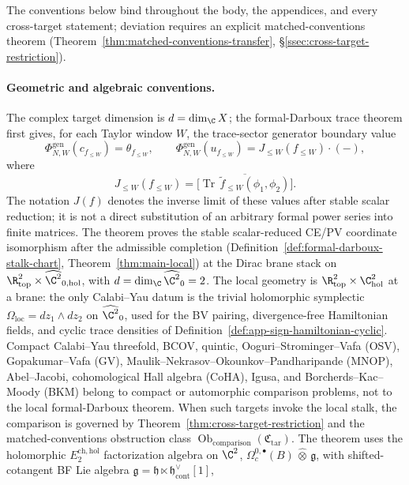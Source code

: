 \documentclass[11pt]{memoir}
\begin{document}
The conventions below bind throughout the body, the appendices,
and every cross-target statement; deviation requires an explicit
matched-conventions theorem
(Theorem~\ref{thm:matched-conventions-transfer},
\S\ref{ssec:cross-target-restriction}).

\paragraph{Geometric and algebraic conventions.}
The complex target dimension is \(d=\dim_\C X\); the formal-Darboux
trace theorem first gives, for each Taylor window \(W\), the
trace-sector generator boundary value
\[
  \Phi_{N,W}^{\mathrm{gen}}(c_{f_{\leq W}})
    =\theta_{f_{\leq W}},\qquad
  \Phi_{N,W}^{\mathrm{gen}}(u_{f_{\leq W}})
    =J_{\leq W}(f_{\leq W})\cdot(-),
\]
where
\[
  J_{\leq W}(f_{\leq W})
  =
  \bigl[\overline{\operatorname{Tr}\,
  \tilde f_{\leq W}(\phi_1,\phi_2)}\bigr].
\]
The notation \(J(f)\) denotes the inverse limit of these values after
stable scalar reduction; it is not a direct substitution of an arbitrary
formal power series into finite matrices.  The theorem proves the stable
scalar-reduced CE/PV coordinate isomorphism after the
admissible completion (Definition~\ref{def:formal-darboux-stalk-chart},
Theorem~\ref{thm:main-local}) at the Dirac brane stack on
\(\R^2_{\mathrm{top}}\times\widehat{\C^2}_{0,\mathrm{hol}}\), with
\(d=\dim_\C\widehat{\C^2}_0=2\).  The local geometry is
\(\R^2_{\mathrm{top}}\times\C^2_{\mathrm{hol}}\) at a brane:
the only Calabi--Yau datum is the trivial holomorphic symplectic
\(\Omega_{\mathrm{loc}}=dz_1\wedge dz_2\) on \(\widehat{\C^2}_0\), used
for the BV pairing, divergence-free Hamiltonian fields, and cyclic
trace densities of Definition~\ref{def:app-sign-hamiltonian-cyclic}.
Compact Calabi--Yau threefold, BCOV, quintic,
Ooguri--Strominger--Vafa (OSV),
Gopakumar--Vafa (GV), Maulik--Nekrasov--Okounkov--Pandharipande (MNOP),
Abel--Jacobi, cohomological Hall algebra (CoHA), Igusa, and
Borcherds--Kac--Moody (BKM) belong to compact or automorphic
comparison problems, not to the local formal-Darboux theorem.  When such
targets invoke the local stalk, the comparison is governed by
Theorem~\ref{thm:cross-target-restriction} and the
matched-conventions obstruction class
\(\operatorname{Ob}_{\mathrm{comparison}}(\mathfrak C_{\mathrm{tar}})\).
The theorem uses the holomorphic
\(E_2^{\mathrm{ch,hol}}\) factorization algebra on \(\C^2\),
\(\Omega^{0,\bullet}_c(B)\,\widehat\otimes\,\mathfrak g\), with shifted-cotangent
BF Lie algebra
\(\mathfrak g=\mathfrak h\ltimes\mathfrak h^\vee_{\mathrm{cont}}[1]\),
\end{document}
